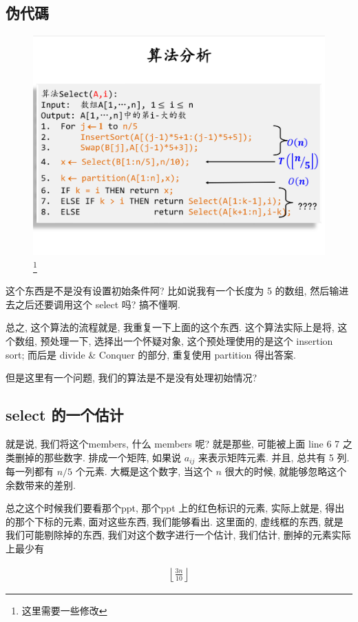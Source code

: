 \documentclass[a4paper, 10pt]{ctexart} %
\begin{document}
\subsection{伪代碼}
\begin{figure}[H]
    \centering
    \includegraphics[scale = 0.3]{3.png}\footnote{这里需要一些修改}\caption{}
\end{figure}
这个东西是不是没有设置初始条件阿? 比如说我有一个长度为 5 的数组, 然后输进去之后还要调用这个 
select 吗? 搞不懂啊.

总之, 这个算法的流程就是, 我重复一下上面的这个东西. 这个算法实际上是将, 这个数组, 预处理一下, 选择出一个怀疑对象, 
这个预处理使用的是这个 insertion sort; 而后是 divide \& Conquer 的部分, 重复使用 partition 得出答案. 

但是这里有一个问题, 我们的算法是不是没有处理初始情况? 
\subsection{select 的一个估计}
就是说, 我们将这个members, 什么 members 呢? 就是那些, 可能被上面 line 6 7 之类删掉的那些数字. 排成一个矩阵, 如果说 $a _{ij}$ 来表示矩阵元素. 并且, 总共有 5 列. 
每一列都有 $ n / 5$ 个元素. 大概是这个数字, 当这个 $n$ 很大的时候, 就能够忽略这个余数带来的差别. 

总之这个时候我们要看那个ppt, 那个ppt 上的红色标识的元素, 实际上就是, 得出的那个下标的元素, 面对这些东西, 我们能够看出. 
这里面的, 虚线框的东西, 就是我们可能剔除掉的东西, 我们对这个数字进行一个估计, 我们估计, 删掉的元素实际上最少有 

\begin{align*}
    \left\lfloor \frac{3n}{10} \right\rfloor
\end{align*}
\end{document}
